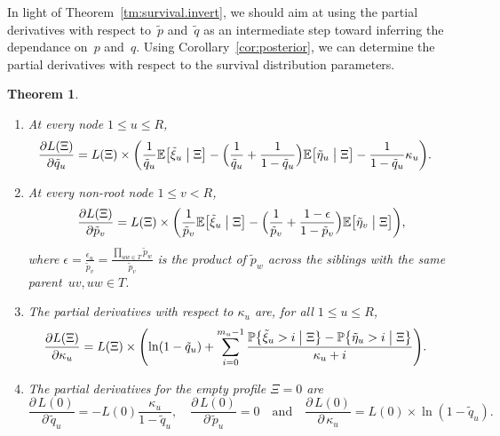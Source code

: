 \documentclass{elsarticle}
\newcommand{\condgen}[6]{{#1}#2 #5 #3 #6 #4}
\newcommand{\EXP}{\mathbb{E}}
\newcommand{\PROB}{\mathbb{P}}
\newcommand{\Probcsm}[2]{\condgen{\PROB}{\bigl\{}{\bigm|}{\bigr\}}{#1}{#2}}
\newcommand{\Expcsm}[2]{\condgen{\EXP}{\bigl[}{\bigm|}{\bigr]}{#1}{#2}}
\newcommand{\Expcmd}[2]{\condgen{\EXP}{\Bigl[}{\Bigm|}{\Bigr]}{#1}{#2}}
\newtheorem{theorem}{Theorem}
\newcommand{\nlik}{C}
\newcommand{\slik}{K}
\newcommand{\solik}{J}
\newcommand{\nx}{u}
\newcommand{\ny}{v}
\newcommand{\nz}{w}
\begin{document}
In light of Theorem~\ref{tm:survival.invert}, we should 
aim at using the partial derivatives with respect 
to~$\tilde{p}$ and~$\tilde{q}$ as 
an intermediate step toward 
inferring the dependance on~$p$ and~$q$. 
Using Corollary~\ref{cor:posterior}, we can determine 
the partial derivatives with respect to the 
survival distribution parameters.
\begin{theorem}\label{tm:Ld}
\begin{enumerate}[label=(\roman*)]
\item At every node $1\le \nx\le R$, 
\begin{align*}
\frac{\partial L(\Xi)}{\partial \tilde{q}_{\nx}} & = 
	L(\Xi)\times \biggl(
		\frac1{\tilde{q}_{\nx}}\Expcsm{\tilde{\xi}_{\nx}}{\Xi}
	- \Bigl(\frac1{\tilde{q}_{\nx}}+\frac1{1-\tilde{q}_{\nx}}\Bigr)\Expcsm{\tilde{\eta}_{\nx}}{\Xi}
	-\frac1{1-\tilde{q}_{\nx}}\kappa_{\nx}\biggr).
\end{align*}
\item At every non-root node $1\le \ny < R$,	
\[
\frac{\partial L(\Xi)}{\partial \tilde{p}_{\ny}} 
= L(\Xi)\times \biggl(
	\frac1{\tilde{p}_{\ny}}\Expcsm{\tilde{\xi}_{\nx}}{\Xi}
 - \Bigl(\frac1{\tilde{p}_{\ny}}+\frac{1-\epsilon}{1-\tilde{p}_{\ny}}\Bigr)\Expcsm{\tilde{\eta}_{\ny}}{\Xi}
 \biggr),
\]
where $\epsilon = \frac{\epsilon_{\nx}}{\tilde{p}_{\ny}}=\frac{\prod_{\nx\nz\in T} \tilde{p}_{\nz}}{\tilde{p}_{\ny}}$
is the product of $\tilde{p}_{\nz}$ across the siblings 
with the same parent~$\nx\ny,\nx\nz\in T$.  
\item The partial derivatives with respect to $\kappa_{\nx}$ are, for all $1\le \nx \le R$,
\begin{align*}
\frac{\partial L(\Xi)}{\partial \kappa_{\nx}}
	& = L(\Xi) \times \Biggl(
		\ln(1-\tilde{q}_{\nx})
	 + \sum_{i=0}^{m_{\nx}-1} \frac{\Probcsm{\tilde{\xi}_{\nx}>i}{\Xi}-\Probcsm{\tilde{\eta}_{\nx}>i}{\Xi}}{\kappa_{\nx}+i}
	 \Biggr).
\end{align*}
%
\item The partial derivatives for the empty profile $\Xi=0$ are
\[
\frac{\partial\,L(0)}{\partial\,\tilde{q}_{\nx}}
= -L(0) \frac{\kappa_{\nx}}{1-\tilde{q}_{\nx}},
\quad
\frac{\partial\,L(0)}{\partial\,\tilde{p}_{\nx}}=0
\quad\text{and}\quad
\frac{\partial\,L(0)}{\partial\,\kappa_{\nx}}=
L(0)\times \ln(1-\tilde{q}_{\nx}).
\]
\end{enumerate}
\end{theorem}
\end{document}
